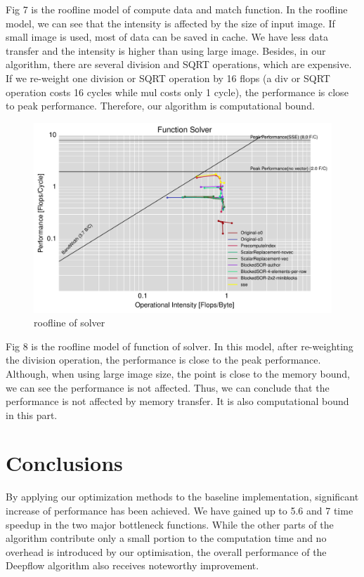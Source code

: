 \documentclass[letterpaper]{article}
\begin{document}
Fig 7 is the roofline model of compute data and match function. In the roofline model, we can see that the intensity is affected by the size of input image. If small image is used, most of data can be saved in cache. We have less data transfer and the intensity is higher than using large image. Besides, in our algorithm, there are several division and SQRT operations, which are expensive. If we re-weight one division or SQRT operation by 16 flops (a div or SQRT operation costs 16 cycles while mul costs only 1 cycle), the performance is close to peak performance. Therefore, our algorithm is computational bound.


\begin{figure}[H]\centering
  \includegraphics[scale=0.45]{roofline_solver.pdf}
  \caption{roofline of solver}
\end{figure}  

Fig 8 is the roofline model of function of solver. In this model, after re-weighting the division operation, the performance is close to the peak performance. Although, when using large image size, the point is close to the memory bound, we can see the performance is not affected. Thus, we can conclude that the performance is not affected by memory transfer. It is also computational bound in this part.

\section{Conclusions}

By applying our optimization methods to the baseline implementation, significant increase of performance has been achieved. We have gained up to 5.6 and 7 time speedup in the two major bottleneck functions. While the other parts of the algorithm contribute only a small portion to the computation time and no overhead is introduced by our optimisation, the overall 
performance of the Deepflow algorithm also receives noteworthy improvement. 
\end{document}
